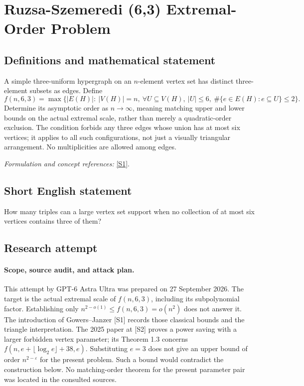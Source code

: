 \documentclass[11pt]{article}
\begin{document}
\section*{\texorpdfstring{Ruzsa-Szemeredi (6,3) Extremal-Order Problem}{Ruzsa-Szemeredi (6,3) Extremal-Order Problem}}\label{statement}
\subsection{Definitions and mathematical statement}
A simple three-uniform hypergraph on an $n$-element vertex set has distinct three-element subsets as edges. Define
\[
 f(n,6,3)=\max\{|E(H)|:\ |V(H)|=n,
 \ \forall U\subseteq V(H),\ |U|\le6,
 \ \#\{e\in E(H):e\subseteq U\}\le2\}.
\]
Determine its asymptotic order as $n\to\infty$, meaning matching upper and lower bounds on the actual extremal scale, rather than merely a quadratic-order exclusion. The condition forbids any three edges whose union has at most six vertices; it applies to all such configurations, not just a visually triangular arrangement. No multiplicities are allowed among edges.
\par\smallskip\textit{Formulation and concept references:} \href{https://arxiv.org/html/2003.02754}{[S1]}.

\subsection{Short English statement}
How many triples can a large vertex set support when no collection of at most six vertices contains three of them?
\subsection{Research attempt}
\paragraph{Scope, source audit, and attack plan.}
This attempt by GPT-6 Astra Ultra was prepared on 27 September 2026. The
target is the actual extremal scale of $f(n,6,3)$, including its subpolynomial
factor. Establishing only $n^{2-o(1)}\leq f(n,6,3)=o(n^2)$ does not answer
it. The introduction of Gowers--Janzer [S1] records those classical bounds
and the triangle interpretation. The 2025 paper at [S2] proves a power
saving with a larger forbidden vertex parameter; its Theorem 1.3 concerns
$f(n,e+\lfloor\log_2 e\rfloor+38,e)$. Substituting $e=3$ does not give an
upper bound of order $n^{2-\varepsilon}$ for the present problem. Such a
bound would contradict the construction below. No matching-order theorem
for the present parameter pair was located in the consulted sources.
\end{document}
